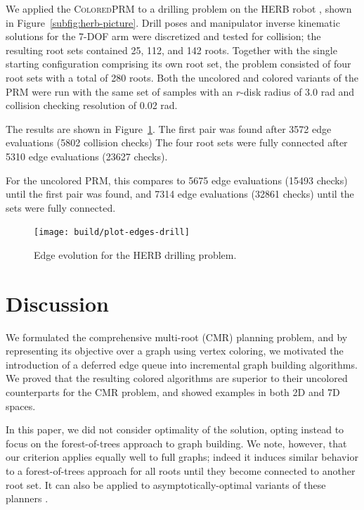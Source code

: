\documentclass{report}
\begin{document}
We applied the \textsc{ColoredPRM} to a drilling problem on the HERB
robot \cite{srinivasa2012herb20}, shown in Figure~\ref{subfig:herb-picture}.
Drill poses and manipulator inverse kinematic solutions for the 7-DOF
arm were discretized and tested for collision;
the resulting root sets contained 25, 112, and 142 roots.
Together with the single starting configuration comprising its own root set,
the problem consisted of four root sets with a total of 280 roots.
Both the uncolored and colored variants of the PRM were run
with the same set of samples with an $r$-disk radius of 3.0 rad
and collision checking resolution of 0.02 rad.

The results are shown in Figure~\ref{fig:herb-drilling}.
The first pair was found after 3572 edge evaluations (5802 collision checks)
The four root sets were fully connected after 5310 edge evaluations
(23627 checks).

For the uncolored PRM,
this compares to 5675 edge evaluations (15493 checks)
until the first pair was found,
and 7314 edge evaluations (32861 checks) until the sets
were fully connected.

\begin{figure}[t]
\centering
\texttt{[image: build/plot-edges-drill]}
\caption{Edge evolution for the HERB drilling problem.}
\label{fig:herb-drilling}
\end{figure}

\section{Discussion}
\label{sec:discussion}

We formulated the comprehensive multi-root (CMR) planning problem,
and by representing its objective over a graph using vertex coloring,
we motivated the introduction of a deferred edge queue into
incremental graph building algorithms.
We proved that the resulting colored algorithms
are superior to their uncolored counterparts for the CMR problem,
and showed examples in both 2D and 7D spaces.

In this paper, we did not consider optimality of the solution,
opting instead to focus on the forest-of-trees approach to graph building.
We note, however, that our criterion applies equally well to full graphs;
indeed it induces similar behavior to a forest-of-trees approach
for all roots until they become connected to another root set.
It can also be applied to  asymptotically-optimal variants of these planners
\cite{karaman2011samplingoptimal}.
\end{document}
